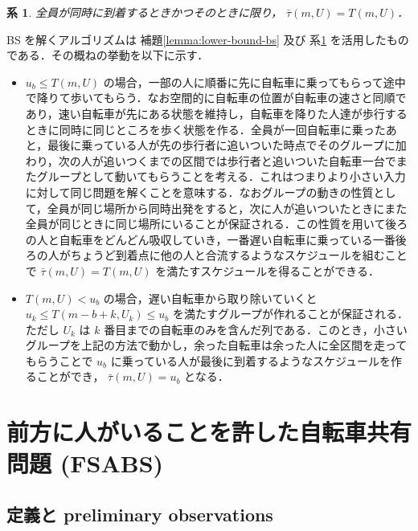 \documentclass[11pt,a4paper]{jarticle}
\newcommand\lemref[1]{補題\ref{lemma:#1}}
\newtheorem{corollary}{系}
\newcommand\corref[1]{系\ref{corollary:#1}}
\begin{document}
\begin{corollary}\label{corollary:lower-bound-bs-equality}
  全員が同時に到着するときかつそのときに限り， $\bar\tau(m, U) = T(m, U)$．
\end{corollary}

BS を解くアルゴリズムは \lemref{lower-bound-bs} 及び \corref{lower-bound-bs-equality} を活用したものである．その概ねの挙動を以下に示す．
\begin{itemize}
\item $u_b \leq T(m, U)$ の場合，一部の人に順番に先に自転車に乗ってもらって途中で降りて歩いてもらう．なお空間的に自転車の位置が自転車の速さと同順であり，速い自転車が先にある状態を維持し，自転車を降りた人達が歩行するときに同時に同じところを歩く状態を作る．全員が一回自転車に乗ったあと，最後に乗っている人が先の歩行者に追いついた時点でそのグループに加わり，次の人が追いつくまでの区間では歩行者と追いついた自転車一台でまたグループとして動いてもらうことを考える．これはつまりより小さい入力に対して同じ問題を解くことを意味する．なおグループの動きの性質として，全員が同じ場所から同時出発をすると，次に人が追いついたときにまた全員が同じときに同じ場所にいることが保証される．この性質を用いて後ろの人と自転車をどんどん吸収していき，一番遅い自転車に乗っている一番後ろの人がちょうど到着点に他の人と合流するようなスケジュールを組むことで $\bar\tau(m, U) = T(m, U)$ を満たすスケジュールを得ることができる．
  \item $T(m, U) < u_b$ の場合，遅い自転車から取り除いていくと $u_k \leq T(m - b + k, U_k) \leq u_b$ を満たすグループが作れることが保証される．ただし $U_k$ は $k$ 番目までの自転車のみを含んだ列である．このとき，小さいグループを上記の方法で動かし，余った自転車は余った人に全区間を走ってもらうことで $u_b$ に乗っている人が最後に到着するようなスケジュールを作ることができ， $\bar\tau(m, U) = u_b$ となる．
\end{itemize}

\section{前方に人がいることを許した自転車共有問題 (FSABS) }

\subsection{定義と preliminary observations}
\end{document}
